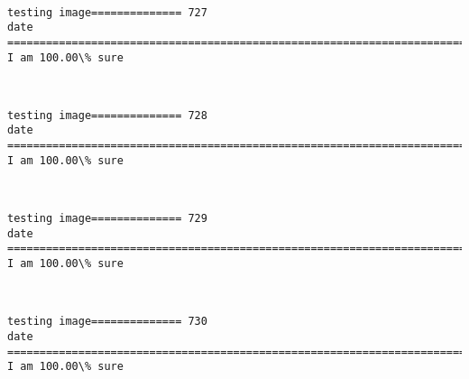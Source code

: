 \documentclass[11pt]{article}
\begin{document}
    \begin{center}
    \end{center}
    { \hspace*{\fill} \\}
    
    \begin{Verbatim}[commandchars=\\\{\}]
testing image============== 727
date
============================================================================
I am 100.00\% sure

    \end{Verbatim}

    \begin{center}
    \end{center}
    { \hspace*{\fill} \\}
    
    \begin{Verbatim}[commandchars=\\\{\}]
testing image============== 728
date
============================================================================
I am 100.00\% sure

    \end{Verbatim}

    \begin{center}
    \end{center}
    { \hspace*{\fill} \\}
    
    \begin{Verbatim}[commandchars=\\\{\}]
testing image============== 729
date
============================================================================
I am 100.00\% sure

    \end{Verbatim}

    \begin{center}
    \end{center}
    { \hspace*{\fill} \\}
    
    \begin{Verbatim}[commandchars=\\\{\}]
testing image============== 730
date
============================================================================
I am 100.00\% sure

    \end{Verbatim}
\end{document}
